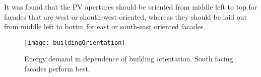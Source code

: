 		It was found that the PV apertures should be oriented from middle left to top for facades that are west or shouth-west oriented, whereas they should be laid out from middle left to bottm for east or south-east oriented facades. 

		\begin{figure*}
		\begin{center}
		\texttt{[image: buildingOrientation]}
		\caption{Energy demand in dependence of building orientation. South facing facades perform best.}
		\label{fig:buildingOrientation}
		\end{center}
		\end{figure*}
